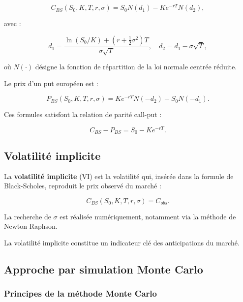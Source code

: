 \begin{equation}
	C_{BS}(S_0,K,T,r,\sigma) = S_0 N(d_1) - Ke^{-rT} N(d_2),
\end{equation}

avec :

\begin{equation}
	d_1 = \frac{\ln(S_0/K) + (r + \frac{1}{2}\sigma^2)T}{\sigma \sqrt{T}}, \quad d_2 = d_1 - \sigma\sqrt{T},
\end{equation}

où $N(\cdot)$ désigne la fonction de répartition de la loi normale centrée réduite.

Le prix d'un put européen est :

\begin{equation}
	P_{BS}(S_0,K,T,r,\sigma) = Ke^{-rT} N(-d_2) - S_0 N(-d_1).
\end{equation}

Ces formules satisfont la relation de parité call-put :

\begin{equation}
	C_{BS} - P_{BS} = S_0 - Ke^{-rT}.
\end{equation}

\subsection{Volatilité implicite}

La \textbf{volatilité implicite} (VI) est la volatilité qui, insérée dans la formule de Black-Scholes, reproduit le prix observé du marché :

\begin{equation}
	C_{BS}(S_0, K, T, r, \sigma) = C_{obs}.
\end{equation}

La recherche de $\sigma$ est réalisée numériquement, notamment via la méthode de Newton-Raphson.

La volatilité implicite constitue un indicateur clé des anticipations du marché.

\subsection{Approche par simulation Monte Carlo}
\label{subsec:bs_monte_carlo}

\subsubsection{Principes de la méthode Monte Carlo}

